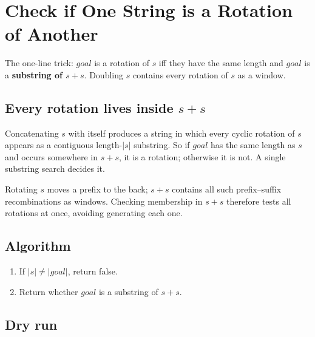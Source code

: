 \section{Check if One String is a Rotation of Another}
\label{sec:str-rotate-string}


\begin{patternbox}
The one-line trick: $goal$ is a rotation of $s$ iff they have the same
length and $goal$ is a \textbf{substring of $s+s$}. Doubling $s$ contains
every rotation of $s$ as a window.
\end{patternbox}

\subsection*{Every rotation lives inside $s+s$}

Concatenating $s$ with itself produces a string in which every cyclic
rotation of $s$ appears as a contiguous length-$|s|$ substring. So if
$goal$ has the same length as $s$ and occurs somewhere in $s+s$, it is a
rotation; otherwise it is not. A single substring search decides it.

\begin{ideabox}
Rotating $s$ moves a prefix to the back; $s+s$ contains all such
prefix--suffix recombinations as windows. Checking membership in $s+s$
therefore tests all rotations at once, avoiding generating each one.
\end{ideabox}

\subsection*{Algorithm}

\begin{enumerate}
  \item If $|s|\ne|goal|$, return false.
  \item Return whether $goal$ is a substring of $s+s$.
\end{enumerate}

\subsection*{Dry run}


